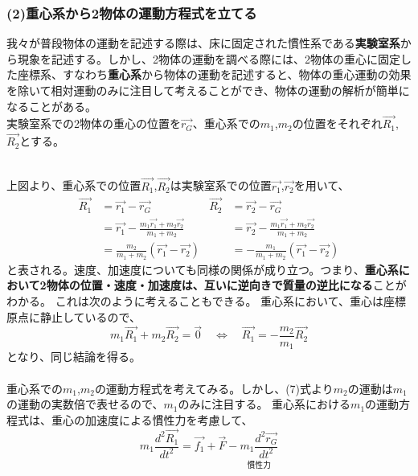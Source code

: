 \documentclass[dvipdfmx,11pt]{jsarticle}
\begin{document}
\subsubsection*{(2)重心系から2物体の運動方程式を立てる}
我々が普段物体の運動を記述する際は、床に固定された慣性系である{\bf 実験室系}から現象を記述する。しかし、2物体の運動を調べる際には、2物体の重心に固定した座標系、すなわち{\bf 重心系}から物体の運動を記述すると、物体の重心運動の効果を除いて相対運動のみに注目して考えることができ、物体の運動の解析が簡単になることがある。
\\実験室系での2物体の重心の位置を$\vec{r_G}$、重心系での$m_1$,$m_2$の位置をそれぞれ$\vec{R_1}$,$\vec{R_2}$とする。
\begin{figure}[h]
    \begin{center}
        
    \end{center}
\end{figure}
\\上図より、重心系での位置$\vec{R_1}$,$\vec{R_2}$は実験室系での位置$\vec{r_1}$,$\vec{r_2}$を用いて、
{\large
\begin{align*}
    \vec{R_1} & =\vec{r_1}-\vec{r_G} & \vec{R_2} & =\vec{r_2}-\vec{r_G}
    \\&=\vec{r_1}-\frac{m_1\vec{r_1}+m_2\vec{r_2}}{m_1+m_2} & &=\vec{r_2}-\frac{m_1\vec{r_1}+m_2\vec{r_2}}{m_1+m_2}
    \\&=\frac{m_2}{m_1+m_2}\left(\vec{r_1}-\vec{r_2}\right) & &=-\frac{m_1}{m_1+m_2}\left(\vec{r_1}-\vec{r_2}\right)
\end{align*}
}
と表される。速度、加速度についても同様の関係が成り立つ。つまり、{\bf 重心系において2物体の位置・速度・加速度は、互いに逆向きで質量の逆比になる}ことがわかる。
これは次のように考えることもできる。
重心系において、重心は座標原点に静止しているので、
\begin{equation}
    m_1\vec{R_1}+m_2\vec{R_2}=\vec{0}\quad\Leftrightarrow\quad\vec{R_1}=-\frac{m_2}{m_1}\vec{R_2}
\end{equation}
となり、同じ結論を得る。
\\\\重心系での$m_1$,$m_2$の運動方程式を考えてみる。しかし、(7)式より$m_2$の運動は$m_1$の運動の実数倍で表せるので、$m_1$のみに注目する。
重心系における$m_1$の運動方程式は、重心の加速度による慣性力を考慮して、
{\large
\begin{equation}
    m_1\frac{d^2\vec{R_1}}{dt^2}=\vec{f_1}+\vec{F}-\underset{\text{慣性力}}{\boxed{m_1\frac{d^2\vec{r_G}}{dt^2}}}
\end{equation}
}
\end{document}
